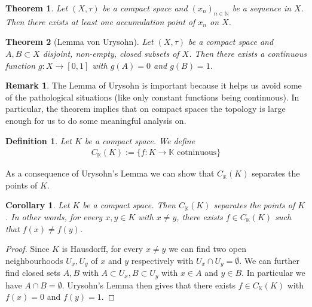 \documentclass[11pt,a4paper]{article}
\newtheorem{thm}{Theorem}[section]
\newtheorem{cor}{Corollary}[section]
\newtheorem{defn}{Definition}[section]
\theoremstyle{definition}
\newtheorem{rem}{Remark}[section]
\begin{document}
\begin{thm} Let $(X, \tau)$ be a compact space and $(x_n)_{n \in \mathbb{N}}$ be a sequence in $X$. Then there exists at least one accumulation point of $x_n$ on $X$. 
\end{thm}
\begin{thm}[Lemma von Urysohn] Let $(X, \tau)$ be a compact space and $A,B \subset X$ disjoint, non-empty, closed subsets of $X$. Then there exists a continuous function $g: X \to [0,1]$ with $g(A)=0$ and $g(B)=1$. 
\end{thm}
\begin{rem} The Lemma of Urysohn is important because it helps us avoid some of the pathological situations (like only constant functions being continuous). In particular, the theorem implies that on compact spaces the topology is large enough for us to do some meaningful analysis on. 
\end{rem}
\newpage
\begin{defn} Let $K$ be a compact space. We define
\begin{align*}
C_\mathbb{K}(K):= \lbrace f: K \to \mathbb{K} \text{ cotninuous}\rbrace
\end{align*}
\end{defn}
\noindent As a consequence of Urysohn's Lemma we can show that $C_\mathbb{K}(K)$ separates the points of $K$. 
\begin{cor} Let $K$ be a compact space. Then $C_\mathbb{K}(K)$ separates the points of $K$. In other words, for every $x,y \in K$ with $x \neq y$, there exists $f \in C_\mathbb{K}(K)$ such that $f(x) \neq f(y)$.
\end{cor}
\begin{proof}
Since $K$ is Hausdorff, for every $x \neq y$ we can find two open neighbourhoods $U_x, U_y$ of $x$ and $y$ respectively with $U_x \cap U_y = \emptyset$. We can further find closed sets $A,B$ with $A \subset U_x, B \subset U_y$ with $x \in A$ and $y \in B$. In particular we have $A \cap B = \emptyset$. Urysohn's Lemma then gives that there exists $f \in C_\mathbb{K}(K)$ with $f(x)=0$ and $f(y)=1$. 
\end{proof}
\end{document}
